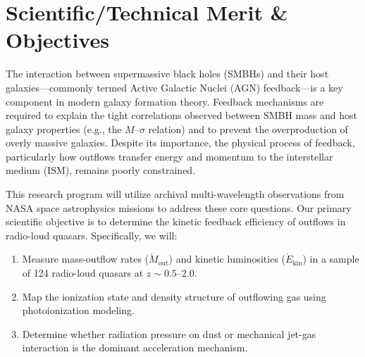 \section{Scientific/Technical Merit \& Objectives}
The interaction between supermassive black holes (SMBHs) and their host galaxies---commonly termed Active Galactic Nuclei (AGN) feedback---is a key component in modern galaxy formation theory. Feedback mechanisms are required to explain the tight correlations observed between SMBH mass and host galaxy properties (e.g., the $M$--$\sigma$ relation) and to prevent the overproduction of overly massive galaxies. Despite its importance, the physical process of feedback, particularly how outflows transfer energy and momentum to the interstellar medium (ISM), remains poorly constrained.

This research program will utilize archival multi-wavelength observations from NASA space astrophysics missions to address these core questions. Our primary scientific objective is to determine the kinetic feedback efficiency of outflows in radio-loud quasars. Specifically, we will:
\begin{enumerate}
    \item Measure mass-outflow rates ($\dot{M}_{\text{out}}$) and kinetic luminosities ($\dot{E}_{\text{kin}}$) in a sample of 124 radio-loud quasars at $z \sim 0.5$--$2.0$.
    \item Map the ionization state and density structure of outflowing gas using photoionization modeling.
    \item Determine whether radiation pressure on dust or mechanical jet-gas interaction is the dominant acceleration mechanism.
\end{enumerate}
